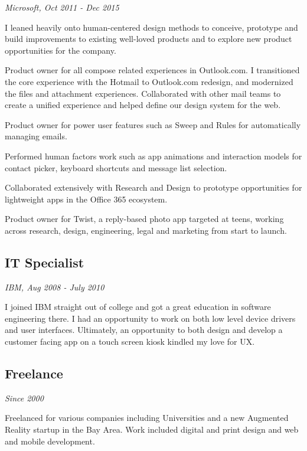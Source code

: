 {\em Microsoft, Oct 2011 - Dec 2015}

I leaned heavily onto human-centered design methods to conceive,
prototype and build improvements to existing well-loved products and to
explore new product opportunities for the company.

\startitemize[packed]
\item
  Product owner for all compose related experiences in Outlook.com. I
  transitioned the core experience with the Hotmail to Outlook.com
  redesign, and modernized the files and attachment experiences.
  Collaborated with other mail teams to create a unified experience and
  helped define our design system for the web.
\item
  Product owner for power user features such as Sweep and Rules for
  automatically managing emails.
\item
  Performed human factors work such as app animations and interaction
  models for contact picker, keyboard shortcuts and message list
  selection.
\item
  Collaborated extensively with Research and Design to prototype
  opportunities for lightweight apps in the Office 365 ecosystem.
\item
  Product owner for Twist, a reply-based photo app targeted at teens,
  working across research, design, engineering, legal and marketing from
  start to launch.
\stopitemize

\subsection[it-specialist]{IT Specialist}

{\em IBM, Aug 2008 - July 2010}

I joined IBM straight out of college and got a great education in
software engineering there. I had an opportunity to work on both low
level device drivers and user interfaces. Ultimately, an opportunity to
both design and develop a customer facing app on a touch screen kiosk
kindled my love for UX.

\subsection[freelance]{Freelance}

{\em Since 2000}

Freelanced for various companies including Universities and a new
Augmented Reality startup in the Bay Area. Work included digital and
print design and web and mobile development.

